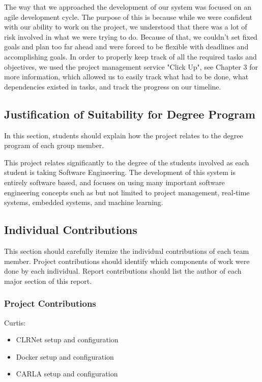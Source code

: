 \documentclass[titlepage]{article}
\begin{document}
The way that we approached the development of our system was focused on an agile development cycle. The purpose of this is because while we were confident with our ability to work on the project, we understood that there was a lot of risk involved in what we were trying to do. Because of that, we couldn't set fixed goals and plan too far ahead and were forced to be flexible with deadlines and accomplishing goals. In order to properly keep track of all the required tasks and objectives, we used the project management service "Click Up", see Chapter 3 for more information, which allowed us to easily track what had to be done, what dependencies existed in tasks, and track the progress on our timeline.

\subsection{Justification of Suitability for Degree Program}
In this section, students should explain how the project
relates to the degree program of each group member.

This project relates significantly to the degree of the students involved as each student is taking Software Engineering. The development of this system is entirely software based, and focuses on using many important software engineering concepts such as but not limited to project management, real-time systems, embedded systems, and machine learning.


\subsection{Individual Contributions}
This section should carefully itemize the individual contributions of each team member. Project contributions should identify which components of work were done by each  individual. Report contributions should list the author of  each major section of this report.

\subsubsection{Project Contributions}

Curtis:
\begin{itemize}
	\item CLRNet setup and configuration
	\item Docker setup and configuration
	\item CARLA setup and configuration
\end{itemize}
\end{document}
